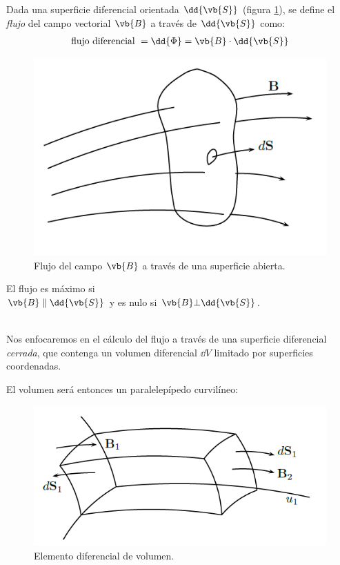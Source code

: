 Dada una superficie diferencial orientada $\dd{\vb{S}}$ (figura \ref{fig:figura_superficie_diferencial}), se define el \emph{flujo} del campo vectorial $\vb{B}$ a través de $\dd{\vb{S}}$ como:
\begin{align*}
\mbox{flujo diferencial } = \dd{\Phi} = \vb{B} \cdot \dd{\vb{S}}
\end{align*}

\begin{minipage}{0.5\linewidth}
\begin{figure}[H]
    \centering
    \includegraphics[scale=0.5]{Imagenes/Superficie_Diferencial.png}
    \caption{Flujo del campo $\vb{B}$ a través de una superficie abierta.}
    \label{fig:figura_superficie_diferencial}
\end{figure}
\end{minipage}
\hspace{0.75cm}
\begin{minipage}{0.4\linewidth}
El flujo es máximo si \\ $\vb{B} \parallel \dd{\vb{S}}$ y es nulo si $\vb{B} \bot \dd{\vb{S}}$.
\end{minipage}
\\[1.5em]
Nos enfocaremos en el cálculo del flujo a través de una superficie diferencial \emph{cerrada}, que contenga un volumen diferencial $\dd{V}$ limitado por superficies coordenadas.
\par
El volumen será entonces un paralelepípedo curvilíneo:
\begin{figure}[H]
    \centering
    \includegraphics[scale=0.75]{Imagenes/Diferencial_Volumen.png}
    \caption{Elemento diferencial de volumen.}
    \label{fig:Diferencial_Volumen}
\end{figure}

